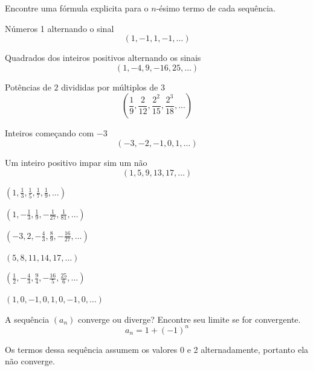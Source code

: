 \begin{exercises}
\begin{exercise}
  Encontre uma fórmula explicita para o $n$-ésimo termo de cada sequência.
  \begin{alphalist}
  \item Números 1 alternando o sinal
    \[ \left( 1, -1, 1, -1,      \dots \right) \]
  \item Quadrados dos inteiros positivos alternando os sinais
    \[ \left( 1, -4, 9, -16, 25, \dots \right) \]
  \item Potências de $2$ divididas por múltiplos de $3$
    \[
      \left( \frac{1}{9},
             \frac{2}{12},
             \frac{2^2}{15},
             \frac{2^3}{18},
             \dots
      \right)
    \]
  \item Inteiros começando com $-3$
    \[ \left( -3, -2, -1, 0, 1, \dots \right) \]
  \item Um inteiro positivo impar sim um não
    \[ \left( 1, 5, 9, 13, 17,  \dots \right) \]
  \item
    \( \left( 1,
      \frac{1}{3},
      \frac{1}{5},
      \frac{1}{7},
      \frac{1}{9},
      \dots \right)
    \)
  \item
    \( \left( 1,
     -\frac{1}{3},
      \frac{1}{9},
     -\frac{1}{27},
      \frac{1}{81},
      \dots \right)
    \)
  \item
    \( \left( -3, 2,
     -\frac{4}{3},
      \frac{8}{9},
     -\frac{16}{27},
      \dots \right)
    \)
  \item \( \left( 5, 8, 11, 14, 17, \dots \right)\)
  \item
    \( \left(
      \frac{1}{2},
     -\frac{4}{3},
      \frac{9}{4},
     -\frac{16}{5},
      \frac{25}{6},
      \dots \right)
    \)
  \item \( \left( 1, 0, -1, 0, 1, 0, -1, 0, \dots \right)\)
  \end{alphalist}
\end{exercise}

\begin{exercise}
A sequência $(a_n)$ converge ou diverge? Encontre seu limite se for convergente.
\[
  a_n = 1 + (-1)^n
\]
\begin{answer}
Os termos dessa sequência assumem os valores 0 e 2 alternadamente, portanto ela não converge.
\end{answer}
\end{exercise}


\end{exercises}
